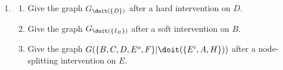 \begin{enumerate}
\begin{enumerate}
\begin{enumerate}
  \end{enumerate}
  Check that your answers agree with Lemma \ref*{marginalizations-commute}.
  \item
  \begin{enumerate}
    \item Give the graph $G_{\doit(\{D\})}$ after a hard intervention on $D$.
    \item Give the graph $G_{\doit(\{I_B\})}$ after a soft intervention on $B$.
    \item Give the graph $G(\{B, C, D, E^o, F\}|\doit(\{E^i, A, H\}))$ after a node-splitting intervention on $E$.
  \end{enumerate}
\end{enumerate}


\end{enumerate}
